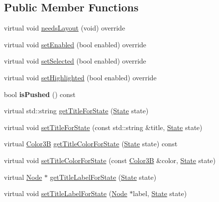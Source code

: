 \subsection*{Public Member Functions}
\begin{DoxyCompactItemize}
\item 
virtual void \hyperlink{classControlButton_acdbe1882298d4920b6ba59e7c72d6aaf}{needs\+Layout} (void) override
\item 
virtual void \hyperlink{classControlButton_ab8b40e3ef7dccccc2b2029c5ae113962}{set\+Enabled} (bool enabled) override
\item 
virtual void \hyperlink{classControlButton_ae096d582a2e0b072677fa2db84f4ff78}{set\+Selected} (bool enabled) override
\item 
virtual void \hyperlink{classControlButton_a463166812b3c42d952264855e2aa3b1d}{set\+Highlighted} (bool enabled) override
\item 
\mbox{\label{classControlButton_acd38bbfbb2449610b82d9ec39b454e0a}} 
bool {\bfseries is\+Pushed} () const
\item 
virtual std\+::string \hyperlink{classControlButton_ab98a3599eecfd9271a5980712562c9c0}{get\+Title\+For\+State} (\hyperlink{classControl_a89e9598cd785841ac91cff3c4798c469}{State} state)
\item 
virtual void \hyperlink{classControlButton_ad2172e46a81238eaff511f9300ad1be7}{set\+Title\+For\+State} (const std\+::string \&title, \hyperlink{classControl_a89e9598cd785841ac91cff3c4798c469}{State} state)
\item 
virtual \hyperlink{structColor3B}{Color3B} \hyperlink{classControlButton_a27b739c0c1948c3a175e95e8eeb58d49}{get\+Title\+Color\+For\+State} (\hyperlink{classControl_a89e9598cd785841ac91cff3c4798c469}{State} state) const
\item 
virtual void \hyperlink{classControlButton_ae0319a5b5a8758e6110aa13ead017321}{set\+Title\+Color\+For\+State} (const \hyperlink{structColor3B}{Color3B} \&color, \hyperlink{classControl_a89e9598cd785841ac91cff3c4798c469}{State} state)
\item 
virtual \hyperlink{classNode}{Node} $\ast$ \hyperlink{classControlButton_ac0d4a47f4324d6c5ab6d69ba0e7b6d50}{get\+Title\+Label\+For\+State} (\hyperlink{classControl_a89e9598cd785841ac91cff3c4798c469}{State} state)
\item 
virtual void \hyperlink{classControlButton_a1272d48903682b8c4bc088e35c6ac370}{set\+Title\+Label\+For\+State} (\hyperlink{classNode}{Node} $\ast$label, \hyperlink{classControl_a89e9598cd785841ac91cff3c4798c469}{State} state)

\end{DoxyCompactItemize}
